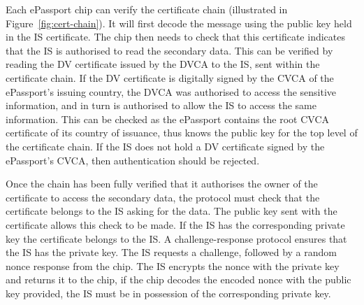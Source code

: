 \documentclass[12pt]{article}
\begin{document}
Each ePassport chip can verify the certificate chain (illustrated in Figure~\ref{fig:cert-chain}). It will first decode the message using the public key held in the IS certificate. The chip then needs to check that this certificate indicates that the IS is authorised to read the secondary data. This can be verified by reading the DV certificate issued by the DVCA to the IS, sent within the certificate chain. If the DV certificate is digitally signed by the CVCA of the ePassport's issuing country, the DVCA was authorised to access the sensitive information, and in turn is authorised to allow the IS to access the same information. This can be checked as the ePassport contains the root CVCA certificate of its country of issuance, thus knows the public key for the top level of the certificate chain. If the IS does not hold a DV certificate signed by the ePassport's CVCA, then authentication should be rejected.

Once the chain has been fully verified that it authorises the owner of the certificate to access the secondary data, the protocol must check that the certificate belongs to the IS asking for the data. The public key sent with the certificate allows this check to be made. If the IS has the corresponding private key the certificate belongs to the IS. A challenge-response protocol ensures that the IS has the private key. The IS requests a challenge, followed by a random nonce response from the chip. The IS encrypts the nonce with the private key and returns it to the chip, if the chip decodes the encoded nonce with the public key provided, the IS must be in possession of the corresponding private key.
\end{document}
